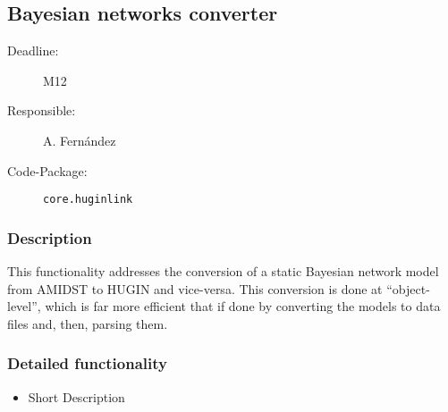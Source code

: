 \subsection{Bayesian networks converter}
\label{ConverterToAMIDST}

\begin{description}
\item[Deadline:] M12
\item[Responsible:] A. Fern\'andez
\item[Code-Package:] \texttt{core.huginlink}
\end{description}

\subsubsection*{Description}

This functionality addresses the conversion of a static Bayesian network model from AMIDST to HUGIN and vice-versa. This conversion is done at ``object-level'', which is far more efficient that if done by converting the models to data files and, then, parsing them. 

\subsubsection*{Detailed functionality}

\begin{itemize}
\item Short Description
\end{itemize}